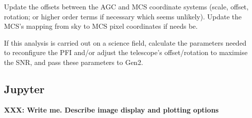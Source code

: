 \documentclass[12pt]{article}
\newcommand{\AGC}{\gls{AGC}\xspace}
\newcommand{\MCS}{\gls{MCS}\xspace}
\newcommand{\PFI}{\gls{PFI}\xspace}
\newcommand{\XXX}[1]{\textbf{XXX: #1}}
\begin{document}
Update the offsets between the \AGC and \MCS coordinate systems (scale, offset, rotation; or higher
order terms if necessary which seems unlikely). Update the \MCS's mapping from sky to MCS pixel
coordinates if needs be.

If this analysis is carried out on a science field, calculate the parameters needed to reconfigure
the \PFI and/or adjust the telescope's offset/rotation to maximise the \gls{SNR}, and pass these
parameters to \gls{Gen2}.


\begin{appendices}

\section{Jupyter}
\label{sec:jupyter}

\XXX{Write me.  Describe image display and plotting options}

\end{appendices}

%
%
\printglossary[type=\acronymtype]
\printglossary
\end{document}
